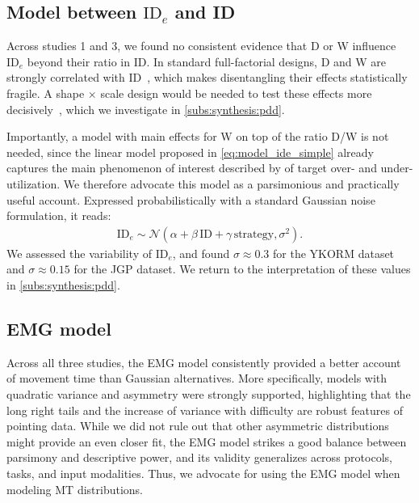 \documentclass[acmlarge, manuscript,review]{acmart}
\newcommand{\ide}{\ensuremath{{\text{ID}_e}}\xspace}
\begin{document}


\subsection{Model between \ide and ID}
Across studies 1 and 3, we found no consistent evidence that D or W influence \ide beyond their ratio in ID. In standard full-factorial designs, D and W are strongly correlated with ID~\cite{gori2018chi}, which makes disentangling their effects statistically fragile. A shape $\times$ scale design would be needed to test these effects more decisively~\cite{guiard2009}, which we investigate in \autoref{subs:synthesis:pdd}.


Importantly, a model with main effects for W on top of the ratio D/W is not needed, since the linear model proposed in \autoref{eq:model_ide_simple} already captures the main phenomenon of interest described by \citeauthor{zhai2004nominal} of target over- and under-utilization. We therefore advocate this model as a parsimonious and practically useful account. Expressed probabilistically with a standard Gaussian noise formulation, it reads:
\begin{align}
	\ide  \sim \mathcal{N}\left( \alpha + \beta\,\text{ID} + \gamma\,\text{strategy}, \sigma^2 \right).\label{eq:probabilistic_ide}
\end{align}
We assessed the variability of \ide, and found $\sigma \approx 0.3$ for the YKORM dataset and $\sigma \approx 0.15$ for the JGP dataset. We return to the interpretation of these values in \autoref{subs:synthesis:pdd}.



\subsection{EMG model}
Across all three studies, the EMG model consistently provided a better account of movement time than Gaussian alternatives. More specifically, models with quadratic variance and asymmetry were strongly supported, highlighting that the long right tails and the increase of variance with difficulty are robust features of pointing data. While we did not rule out that other asymmetric distributions might provide an even closer fit, the EMG model strikes a good balance between parsimony and descriptive power, and its validity generalizes across protocols, tasks, and input modalities. Thus, we advocate for using the EMG model when modeling MT distributions. 
\end{document}
